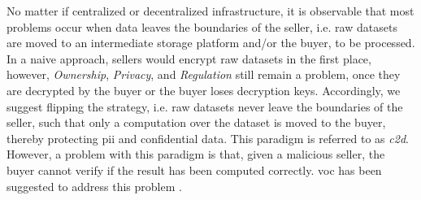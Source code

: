 

\newpage
\noindent No matter if centralized or decentralized infrastructure, it is observable that most problems occur when data leaves the boundaries of the seller, i.e. raw datasets are moved to an intermediate storage platform and/or the buyer, to be processed. In a naive approach, sellers would encrypt raw datasets in the first place, however, \emph{Ownership}, \emph{Privacy}, and \emph{Regulation} still remain a problem, once they are decrypted by the buyer or the buyer loses decryption keys. Accordingly, we suggest flipping the strategy, i.e. raw datasets never leave the boundaries of the seller, such that only a computation over the dataset is moved to the buyer, thereby protecting \acrshort{pii} and confidential data. This paradigm is referred to as \emph{\acrfull{c2d}}. However, a problem with this paradigm is that, given a malicious seller, the buyer cannot verify if the result has been computed correctly. \acrfull{voc} has been suggested to address this problem \cite{eberhardtBlockchainInsightsOffChaining2017,eberhardtOffchainingModelsApproaches2018}.


